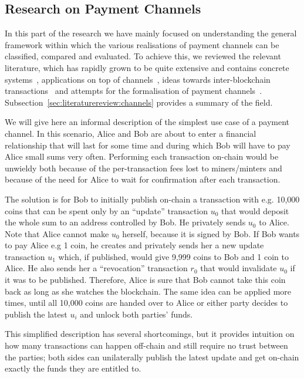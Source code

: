 \subsection{Research on Payment Channels}
  In this part of the research we have mainly focused on understanding the general
  framework within which the various realisations of payment channels can be classified,
  compared and evaluated. To achieve this, we reviewed the relevant literature, which has
  rapidly grown to be quite extensive and contains concrete
  systems~\cite{lightning,perun,teechan,duplexchannels,anonchannels,spriteschannels,fulgorrayo,bolt},
  applications on top of channels~\cite{blindsigncoins}, ideas towards inter-blockchain
  transactions~\cite{atomicswaps} and attempts for the formalisation
  of payment channels~\cite{statechannels}. Subsection~\ref{sec:literaturereview:channels}
  provides a summary of the field.

  We will give here an informal description of the simplest use case of a payment channel.
  In this scenario, Alice and Bob are about to enter a financial relationship that will
  last for some time and during which Bob will have to pay Alice small sums very often.
  Performing each transaction on-chain would be unwieldy both because of the
  per-transaction fees lost to miners/minters and because of the need for Alice to wait
  for confirmation after each transaction.

  The solution is for Bob to initially publish on-chain a transaction with e.g. 10,000
  coins that can be spent only by an ``update'' transaction $u_0$ that would deposit the
  whole sum to an address controlled by Bob. He privately sends $u_0$ to Alice. Note that
  Alice cannot make $u_0$ herself, because it is signed by Bob. If Bob wants to pay Alice
  e.g 1 coin, he creates and privately sends her a new update transaction $u_1$ which, if
  published, would give 9,999 coins to Bob and 1 coin to Alice. He also sends her a
  ``revocation'' transaction $r_0$ that would invalidate $u_0$ if it was to be published.
  Therefore, Alice is sure that Bob cannot take this coin back as long as she watches the
  blockchain. The same idea can be applied more times, until all 10,000 coins are handed
  over to Alice or either party decides to publish the latest $u_i$ and unlock both
  parties' funds.

  This simplified description has several shortcomings, but it provides intuition on how
  many transactions can happen off-chain and still require no trust between the parties;
  both sides can unilaterally publish the latest update and get on-chain exactly the funds
  they are entitled to.

